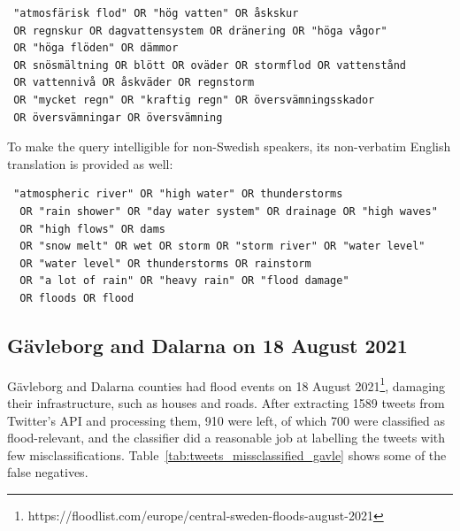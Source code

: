 \begin{verbatim}
 "atmosfärisk flod" OR "hög vatten" OR åskskur
 OR regnskur OR dagvattensystem OR dränering OR "höga vågor"
 OR "höga flöden" OR dämmor
 OR snösmältning OR blött OR oväder OR stormflod OR vattenstånd
 OR vattennivå OR åskväder OR regnstorm
 OR "mycket regn" OR "kraftig regn" OR översvämningsskador
 OR översvämningar OR översvämning
\end{verbatim}

To make the query intelligible for non-Swedish speakers, its non-verbatim English translation is
provided as well:

\begin{verbatim}
 "atmospheric river" OR "high water" OR thunderstorms
  OR "rain shower" OR "day water system" OR drainage OR "high waves"
  OR "high flows" OR dams
  OR "snow melt" OR wet OR storm OR "storm river" OR "water level"
  OR "water level" OR thunderstorms OR rainstorm
  OR "a lot of rain" OR "heavy rain" OR "flood damage"
  OR floods OR flood
\end{verbatim}

\subsection{Gävleborg and Dalarna on 18 August 2021}

Gävleborg and Dalarna counties had flood events on 18 August
2021\footnote{https://floodlist.com/europe/central-sweden-floods-august-2021}, damaging their
infrastructure, such as houses and roads. After extracting 1589 tweets from Twitter's API and
processing them, 910 were left, of which 700 were classified as flood-relevant, and the classifier
did a reasonable job at labelling the tweets with few misclassifications.
Table~\ref{tab:tweets_missclassified_gavle} shows some of the false negatives.

